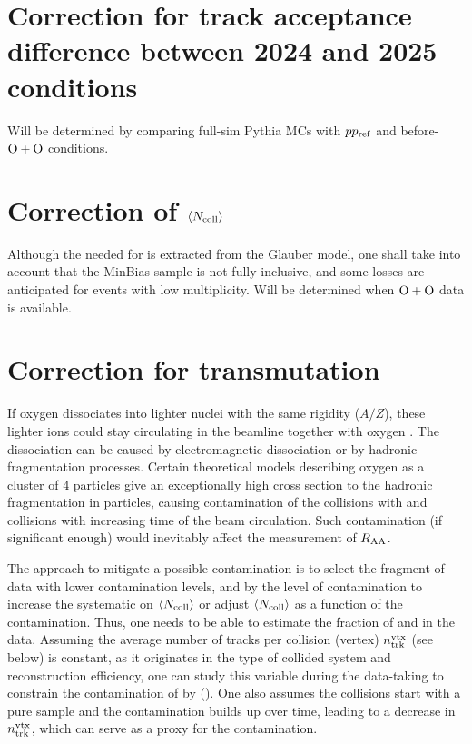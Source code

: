   
\section{Correction for track acceptance difference between 2024 and 2025 conditions}
{\blue Will be determined by comparing full-sim Pythia MCs with $pp_{\mathrm{ref}}$ and before-$\OO$ conditions.}

\section{Correction of $\langle N_{\text{coll}}\rangle$}
Although the \Ncoll needed for \RAA is extracted from the Glauber model, one shall take into account that the MinBias sample is not fully inclusive, and some losses are anticipated for events with low multiplicity.
{\blue Will be determined when $\OO$ data is available.}



\section{Correction for transmutation}\label{sec:transmutation_correction}

If oxygen dissociates into lighter nuclei with the same rigidity ($A/Z$), these lighter ions could stay circulating in the beamline together with oxygen \cite{transmutation_lpc}. The dissociation can be caused by electromagnetic dissociation or by hadronic fragmentation processes. Certain theoretical models describing oxygen as a cluster of 4 \al particles give an exceptionally high cross section to the hadronic fragmentation in \al particles, causing contamination of the \OO collisions with \Oa and \alal collisions with increasing time of the beam circulation. Such contamination (if significant enough) would inevitably affect the measurement of $\RAA$.

The approach to mitigate a possible contamination is to select the fragment of data with lower contamination levels, and by the level of contamination to increase the systematic on $\langle N_{\text{coll}}\rangle$ or adjust $\langle N_{\text{coll}}\rangle$ as a function of the contamination. Thus, one needs to be able to estimate the fraction of \Oa and \alal in the data. Assuming the average number of tracks per collision (vertex) $n_\text{trk}^\text{vtx}$ (see below) is constant, as it originates in the type of collided system and reconstruction efficiency, one can study this variable during the \OO data-taking to constrain the contamination of \OO by \Oa (\alal). One also assumes the collisions start with a pure \OO sample and the contamination builds up over time, leading to a decrease in $n_\text{trk}^\text{vtx}$, which can serve as a proxy for the contamination.


